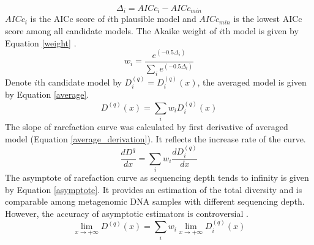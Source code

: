 \documentclass[11pt]{article}
\begin{document}
      \begin{equation}
        \Delta_i = AICc_i-AICc_{min}
        \label{Delta}
      \end{equation}
      $AICc_i$ is the AICc score of $i$th plausible model and $AICc_{min}$ is the lowest AICc score among all candidate models. 
      The Akaike weight of $i$th model is given by Equation \ref{weight} \citep{anderson2007model}.
      \begin{equation}
        w_i = \frac{e^{(-0.5\Delta_i)}}{\sum_{i}e^{(-0.5\Delta_i)}}
        \label{weight}
      \end{equation}
      Denote $i$th candidate model by $D^{(q)}_i = D^{(q)}_i(x)$, the averaged model is given by Equation \ref{average}.
      \begin{equation}
        D^{(q)}(x) = \sum_{i}w_iD^{(q)}_i(x)
        \label{average}
      \end{equation}
      The slope of rarefaction curve was calculated by first derivative of averaged model (Equation \ref{average_derivation}). 
      It reflects the increase rate of the curve.
      \begin{equation}
        \frac{dD^{q}}{dx} = \sum_{i}w_i\frac{dD^{(q)}_i}{dx}
        \label{average_derivation}
      \end{equation}
      The asymptote of rarefaction curve as sequencing depth tends to infinity is given by Equation \ref{asymptote}. 
      It provides an estimation of the total diversity and is comparable among metagenomic DNA samples with different sequencing depth. 
      However, the accuracy of asymptotic estimators is controversial \citep{colwell1994estimating,chazdon1998statistical,jimenez2006comparing,hortal2006evaluating}.
      \begin{equation}
        \lim_{x \to +\infty}D^{(q)}(x) = \sum_{i}w_i\lim_{x \to +\infty}D^{(q)}_i(x)
        \label{asymptote}
      \end{equation}
\end{document}
